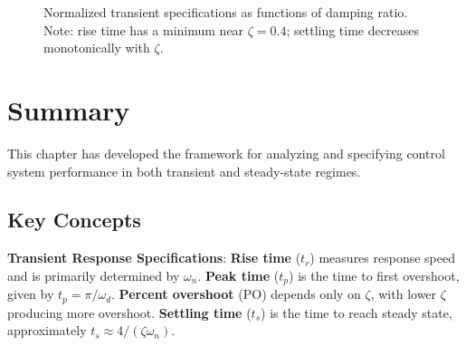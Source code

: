 \begin{figure}[H]
\centering
{}
\caption{Normalized transient specifications as functions of damping ratio. Note: rise time has a minimum near $\zeta = 0.4$; settling time decreases monotonically with $\zeta$.}
\label{fig:specs_vs_zeta}
\end{figure}

\section{Summary}

This chapter has developed the framework for analyzing and specifying control system performance in both transient and steady-state regimes.

\subsection*{Key Concepts}

\textbf{Transient Response Specifications}: \textbf{Rise time} ($t_r$) measures response speed and is primarily determined by $\omega_n$. \textbf{Peak time} ($t_p$) is the time to first overshoot, given by $t_p = \pi/\omega_d$. \textbf{Percent overshoot} (PO) depends only on $\zeta$, with lower $\zeta$ producing more overshoot. \textbf{Settling time} ($t_s$) is the time to reach steady state, approximately $t_s \approx 4/(\zeta\omega_n)$.

